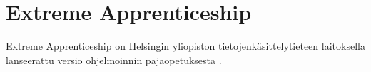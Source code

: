 \section{Extreme Apprenticeship}

Extreme Apprenticeship on Helsingin yliopiston tietojenkäsittelytieteen laitoksella lanseerattu versio ohjelmoinnin pajaopetuksesta \cite{Vihavainen:2011:EAM:1953163.1953196}.


